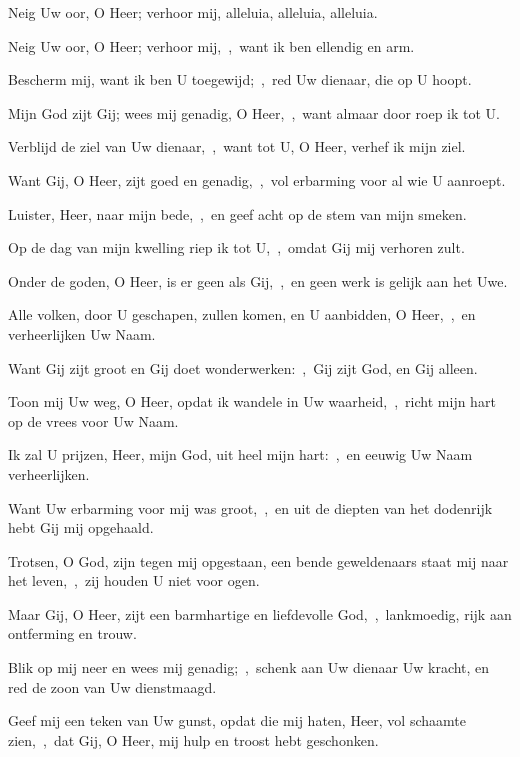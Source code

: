 \documentclass[12pt,twoside,a5paper]{article}
\begin{document}
\begin{halfparskip}
  Neig Uw oor, O Heer; verhoor mij, alleluia, alleluia, alleluia.

  Neig Uw oor, O Heer; verhoor mij,~\sep\ want ik ben ellendig en arm.

  Bescherm mij, want ik ben U toegewijd;~\sep\ red Uw dienaar, die op U hoopt.

  Mijn God zijt Gij; wees mij genadig, O Heer,~\sep\ want almaar door roep ik tot U.

  Verblijd de ziel van Uw dienaar,~\sep\ want tot U, O Heer, verhef ik mijn ziel.

  Want Gij, O Heer, zijt goed en genadig,~\sep\ vol erbarming voor al wie U aanroept.

  Luister, Heer, naar mijn bede,~\sep\ en geef acht op de stem van mijn smeken.

  Op de dag van mijn kwelling riep ik tot U,~\sep\ omdat Gij mij verhoren zult.

  Onder de goden, O Heer, is er geen als Gij,~\sep\ en geen werk is gelijk aan het Uwe.

  Alle volken, door U geschapen, zullen komen, en U aanbidden, O Heer,~\sep\ en verheerlijken Uw Naam.

  Want Gij zijt groot en Gij doet wonderwerken:~\sep\ Gij zijt God, en Gij alleen.

  Toon mij Uw weg, O Heer, opdat ik wandele in Uw waarheid,~\sep\ richt mijn hart op de vrees voor Uw Naam.

  Ik zal U prijzen, Heer, mijn God, uit heel mijn hart:~\sep\ en eeuwig Uw Naam verheerlijken.

  Want Uw erbarming voor mij was groot,~\sep\ en uit de diepten van het dodenrijk hebt Gij mij opgehaald.

  Trotsen, O God, zijn tegen mij opgestaan, een bende geweldenaars staat mij naar het leven,~\sep\ zij houden U niet voor ogen.

  Maar Gij, O Heer, zijt een barmhartige en liefdevolle God,~\sep\ lankmoedig, rijk aan ontferming en trouw.

  Blik op mij neer en wees mij genadig;~\sep\ schenk aan Uw dienaar Uw kracht, en red de zoon van Uw dienstmaagd.

  Geef mij een teken van Uw gunst, opdat die mij haten, Heer, vol schaamte zien,~\sep\ dat Gij, O Heer, mij hulp en troost hebt geschonken.
\end{halfparskip}

\end{document}
